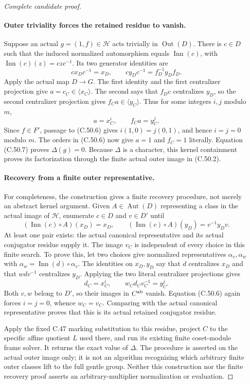 \begin{proof}[Complete candidate proof]
\paragraph{Outer triviality forces the retained residue to vanish.}
Suppose an actual $g=(1,f)\in\mathcal H$ acts trivially in
$\operatorname{Out}(D)$. There is $c\in D$ such that the
induced normalized automorphism equals $\operatorname{Inn}(c)$,
with $\operatorname{Inn}(c)(z)=czc^{-1}$. Its two generator
identities are
\[
             cx_Dc^{-1}=x_D,\qquad
             c y_Dc^{-1}=f_D^{-1}y_Df_D.             \tag{C.50.11}
\]
Apply the actual map $D\to G$. The first identity and the first
centralizer projection give $a=c_C\in\langle x_C\rangle$.
The second says that $f_Dc$ centralizes $y_D$, so the second
centralizer projection gives $f_Ca\in\langle y_C\rangle$.
Thus for some integers $i,j$ modulo $m$,
\[
                     a=x_C^i,\qquad f_Ca=y_C^j.       \tag{C.50.12}
\]
Since $f\in F'$, passage to (C.50.6) gives
$i(1,0)=j(0,1)$, and hence $i=j=0$ modulo $m$.
The orders in (C.50.6) now give $a=1$ and $f_C=1$ literally.
Equation (C.50.7) proves $\Delta(g)=0$.
Because $\Delta$ is a character, this kernel containment proves
its factorization through the finite actual outer image in
(C.50.2).

\paragraph{Recovery from a finite outer representative.}
For completeness, the construction gives a finite recovery procedure,
not merely an abstract kernel argument. Given
$A\in\operatorname{Aut}(D)$ representing a class in the actual
image of $\mathcal H$, enumerate $c\in D$ and $v\in D'$ until
\[
 (\operatorname{Inn}(c)\circ A)(x_D)=x_D,\qquad
 (\operatorname{Inn}(c)\circ A)(y_D)=v^{-1}y_Dv.       \tag{C.50.13}
\]
At least one pair exists: the actual canonical representative and its
actual conjugator residue supply it. The image $v_C$ is independent
of every choice in this finite search. To prove this, let two choices
give normalized representatives $\alpha_v,\alpha_w$ with
$\alpha_w=\operatorname{Inn}(d)\circ\alpha_v$.
The identities on $x_D,y_D$ say that $d$ centralizes $x_D$
and that $wdv^{-1}$ centralizes $y_D$. Applying the two literal
centralizer projections gives
\[
                  d_C=x_C^i,\qquad w_Cd_Cv_C^{-1}=y_C^j.
                                                               \tag{C.50.14}
\]
Both $v,w$ belong to $D'$, so their images in $C^{\rm ab}$
vanish. Equation (C.50.6) again forces $i=j=0$, whence
$w_C=v_C$. Comparing with the actual canonical representative
proves that this is its actual retained conjugator residue.

Apply the fixed C.47 marking substitution to this residue, project
$C$ to the specific affine quotient $L$ used there, and run its
existing finite coset-module frame solver. It returns the exact
value of $\Delta$. The procedure is asserted on the actual outer
image only; it is not an algorithm recognizing which arbitrary
finite outer classes lift to the full gentle group. Neither this
construction nor the finite recovery proof asserts an
arbitrary-multiplier normalization or evaluation.
\end{proof}
